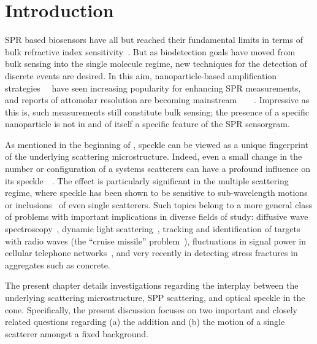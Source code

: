 \section{Introduction}
SPR based biosensors have all but reached their fundamental limits in terms of
bulk refractive index sensitivity~\cite{piliarik2009surface}.  But as
biodetection goals have moved from bulk sensing into the single molecule
regime, new techniques for the detection of discrete events are desired.  In
this aim, nanoparticle-based amplification
strategies~\cite{wang2005nanomaterial}~\cite{jain2007review} have seen
increasing popularity for enhancing SPR measurements, and reports of attomolar
resolution are becoming
mainstream~\cite{fang2006attomole}~\cite{krishnan2011attomolar}~\cite{kwon2012nanoparticle}~\cite{sim2010attomolar}.
Impressive as this is, such measurements still constitute bulk sensing; the
presence of a specific nanoparticle is not in and of itself a specific feature
of the SPR sensorgram.

As mentioned in the beginning of , speckle can be viewed
as a unique fingerprint~\cite{ravikanth2001physical} of the underlying
scattering microstructure.  Indeed, even a small change in the number or
configuration of a systems scatterers can have a profound influence on its
speckle~\cite{berkovits1994correlations}~\cite{feng1986sensitivity}.  The
effect is particularly significant in the multiple scattering regime, where
speckle has been shown to be sensitive to sub-wavelength
motions~\cite{berkovits1991sensitivity} or
inclusions~\cite{berkovits1990theory} of even single scatterers.  Such topics
belong to a more general class of problems with important implications in
diverse fields of study: diffusive wave spectroscopy~\cite{pine1988diffusing},
dynamic light scattering~\cite{berne2000dynamic}, tracking and identification
of targets with radio waves (the ``cruise missile''
problem~\cite{atkins1991neural}), fluctuations in signal power in cellular
telephone networks~\cite{abdi2001estimation}, and very recently in detecting
stress fractures in aggregates such as concrete.

The present chapter details investigations regarding the interplay between the
underlying scattering microstructure, SPP scattering, and optical speckle in
the cone.  Specifically, the present discussion focuses on two important and
closely related questions regarding (a) the addition and (b) the motion of a
single scatterer amongst a fixed background.
